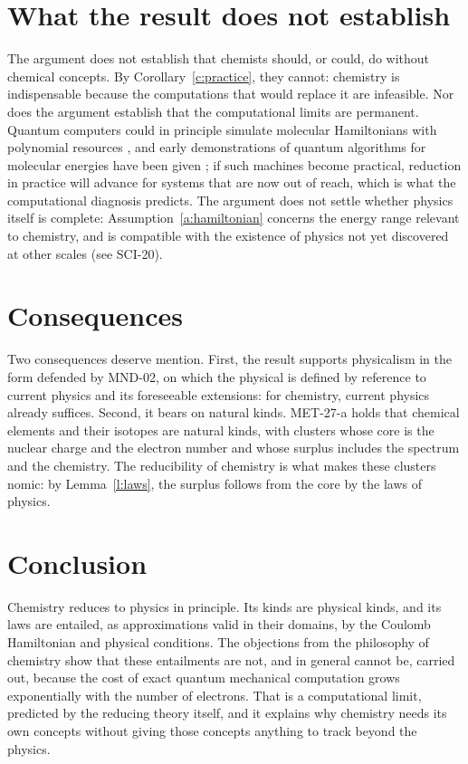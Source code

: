 \documentclass{situationist-preprint}
\begin{document}
\section{What the result does not establish}

The argument does not establish that chemists should, or could, do without chemical concepts. By Corollary~\ref{c:practice}, they cannot: chemistry is indispensable because the computations that would replace it are infeasible. Nor does the argument establish that the computational limits are permanent. Quantum computers could in principle simulate molecular Hamiltonians with polynomial resources \citep{Feynman1982,Lloyd1996}, and early demonstrations of quantum algorithms for molecular energies have been given \citep{AspuruGuzik2005}; if such machines become practical, reduction in practice will advance for systems that are now out of reach, which is what the computational diagnosis predicts. The argument does not settle whether physics itself is complete: Assumption~\ref{a:hamiltonian} concerns the energy range relevant to chemistry, and is compatible with the existence of physics not yet discovered at other scales (see SCI-20).

\section{Consequences}

Two consequences deserve mention. First, the result supports physicalism in the form defended by MND-02, on which the physical is defined by reference to current physics and its foreseeable extensions: for chemistry, current physics already suffices. Second, it bears on natural kinds. MET-27-a holds that chemical elements and their isotopes are natural kinds, with clusters whose core is the nuclear charge and the electron number and whose surplus includes the spectrum and the chemistry. The reducibility of chemistry is what makes these clusters nomic: by Lemma~\ref{l:laws}, the surplus follows from the core by the laws of physics.

\section{Conclusion}

Chemistry reduces to physics in principle. Its kinds are physical kinds, and its laws are entailed, as approximations valid in their domains, by the Coulomb Hamiltonian and physical conditions. The objections from the philosophy of chemistry show that these entailments are not, and in general cannot be, carried out, because the cost of exact quantum mechanical computation grows exponentially with the number of electrons. That is a computational limit, predicted by the reducing theory itself, and it explains why chemistry needs its own concepts without giving those concepts anything to track beyond the physics.
\end{document}
